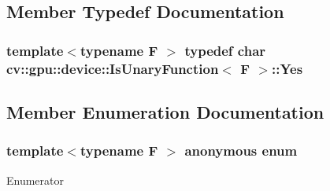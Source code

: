 \subsection{Member Typedef Documentation}
\hypertarget{structcv_1_1gpu_1_1device_1_1IsUnaryFunction_af3211ec0f917bee79645b078a0760c7e}{
\subsubsection[{Yes}]{\setlength{\rightskip}{0pt plus 5cm}template$<$typename F $>$ typedef char {\bf cv\-::gpu\-::device\-::\-Is\-Unary\-Function}$<$ {\bf F} $>$\-::{\bf Yes}}}\label{structcv_1_1gpu_1_1device_1_1IsUnaryFunction_af3211ec0f917bee79645b078a0760c7e}


\subsection{Member Enumeration Documentation}
\hypertarget{structcv_1_1gpu_1_1device_1_1IsUnaryFunction_a7682afa8f40d4542d6abc07f46790aa3}{\subsubsection[{anonymous enum}]{\setlength{\rightskip}{0pt plus 5cm}template$<$typename F $>$ anonymous enum}}\label{structcv_1_1gpu_1_1device_1_1IsUnaryFunction_a7682afa8f40d4542d6abc07f46790aa3}
\begin{Desc}
\item[Enumerator]\par
\begin{description}
\item[{\em 
\hypertarget{structcv_1_1gpu_1_1device_1_1IsUnaryFunction_a7682afa8f40d4542d6abc07f46790aa3a819ca7f4c23acab4560d6b157e790dbc}{value}\label{structcv_1_1gpu_1_1device_1_1IsUnaryFunction_a7682afa8f40d4542d6abc07f46790aa3a819ca7f4c23acab4560d6b157e790dbc}
}]\end{description}
\end{Desc}


